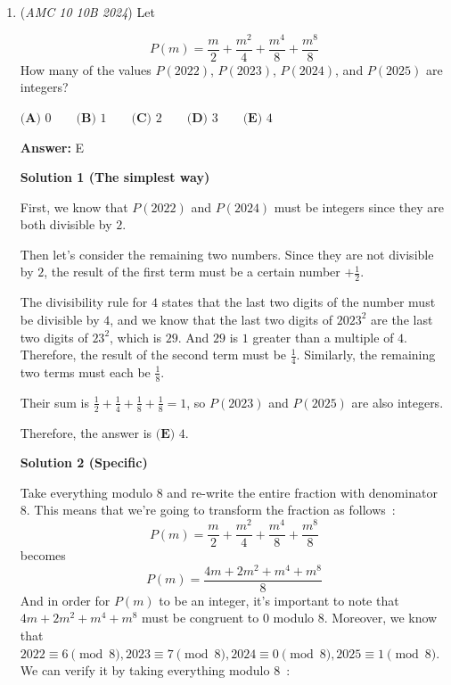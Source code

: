 \begin{enumerate}
 In this case, the answer is $\boxed{\textbf{(B) }319}$

 -\href{https://artofproblemsolving.com/wiki/index.php?title=User:Reddessiner&action=edit&redlink=1}{reddessiner} note that this is a terrible cheese and adheres to no logic whatsoever, I don't even know if this counts as a solution-Happymaths

 


	\item (\textit{AMC 10 10B 2024}) Let

 \[P(m)=\frac{m}{2}+\frac{m^2}{4}+\frac{m^4}{8}+\frac{m^8}{8}\]
How many of the values $P(2022)$, $P(2023)$, $P(2024)$, and $P(2025)$ are integers?


 $\textbf{(A) } 0 \qquad\textbf{(B) } 1 \qquad\textbf{(C) } 2 \qquad\textbf{(D) } 3 \qquad\textbf{(E) } 4$

 \textbf{Answer: }E



\textbf{Solution 1 (The simplest way)}

First, we know that $P(2022)$ and $P(2024)$ must be integers since they are both divisible by $2$. 

 Then let’s consider the remaining two numbers. Since they are not divisible by $2$, the result of the first term must be a certain number $+\frac{1}{2}$. 

 The divisibility rule for $4$ states that the last two digits of the number must be divisible by $4$, and we know that the last two digits of ${2023}^2$ are the last two digits of ${23}^2$, which is $29$. And $29$ is $1$ greater than a multiple of $4$. Therefore, the result of the second term must be $\frac{1}{4}$. Similarly, the remaining two terms must each be $\frac{1}{8}$.

 Their sum is $\frac{1}{2} + \frac{1}{4} + \frac{1}{8} + \frac{1}{8} = 1$, so $P(2023)$ and $P(2025)$ are also integers.

 Therefore, the answer is $\boxed{\textbf{(E) }4}$.

 



\textbf{Solution 2 (Specific)}

Take everything modulo 8 and re-write the entire fraction with denominator 8. This means that we're going to transform the fraction as follows : 
 \[P(m)=\frac{m}{2}+\frac{m^2}{4}+\frac{m^4}{8}+\frac{m^8}{8}\]becomes 
 \[P(m)=\frac{4m + 2m^2 + m^4 + m^8}{8}\]And in order for $P(m)$ to be an integer, it's important to note that $4m + 2m^2 + m^4 + m^8$ must be congruent to 0 modulo 8. Moreover, we know that $2022 \equiv 6 \pmod 8, 2023 \equiv 7 \pmod 8, 2024 \equiv 0 \pmod 8, 2025 \equiv 1 \pmod 8$. We can verify it by taking everything modulo 8 : 


\end{enumerate}
